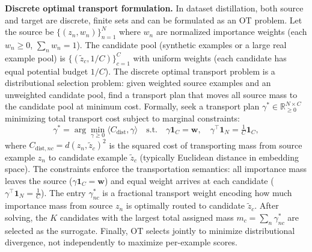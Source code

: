 \begin{foldable}
  \textbf{Discrete optimal transport formulation.}
  In dataset distillation, both source and target are discrete, finite sets and can be formulated as an \ac{OT} problem.
  Let the source be $\{(z_n, w_n)\}_{n=1}^{N}$ where $w_n$ are normalized importance weights (each $w_n \geq 0$, $\sum_n w_n = 1$).
  The candidate pool (synthetic examples or a large real example pool) is $\{(\tilde{z}_c, 1/C)\}_{c=1}^{C}$ with uniform weights (each candidate has equal potential budget $1/C$).
  The discrete optimal transport problem is a distributional selection problem: given weighted source examples and an unweighted candidate pool, find a transport plan that moves all source mass to the candidate pool at minimum cost.
  Formally, seek a transport plan $\gamma^* \in \mathbb{R}^{N \times C}_{\geq 0}$ minimizing total transport cost subject to marginal constraints:
  \begin{equation}
    \gamma^* = \arg\min_{\gamma \geq 0} \langle C_{\text{dist}}, \gamma \rangle
    \quad \text{s.t.} \quad \gamma \mathbf{1}_C = \mathbf{w}, \quad
    \gamma^\top \mathbf{1}_N = \tfrac{1}{C}\mathbf{1}_C,
    \label{eq:discrete-ot}
  \end{equation}
  where $C_{\text{dist},nc} = d(z_n, \tilde{z}_c)^2$ is the squared cost of transporting mass from source example $z_n$ to candidate example $\tilde{z}_c$ (typically Euclidean distance in embedding space).
  The constraints enforce the transportation semantics: all importance mass leaves the source ($\gamma \mathbf{1}_C = \mathbf{w}$) and equal weight arrives at each candidate ($\gamma^\top \mathbf{1}_N = \tfrac{1}{C}$).
  The entry $\gamma^*_{nc}$ is a fractional transport weight encoding how much importance mass from source $z_n$ is optimally routed to candidate $\tilde{z}_c$.
  After solving, the $K$ candidates with the largest total assigned mass $m_c = \sum_n \gamma^*_{nc}$ are selected as the surrogate.
  Finally, \ac{OT} selects jointly to minimize distributional divergence, not independently to maximize per-example scores.
\end{foldable}

